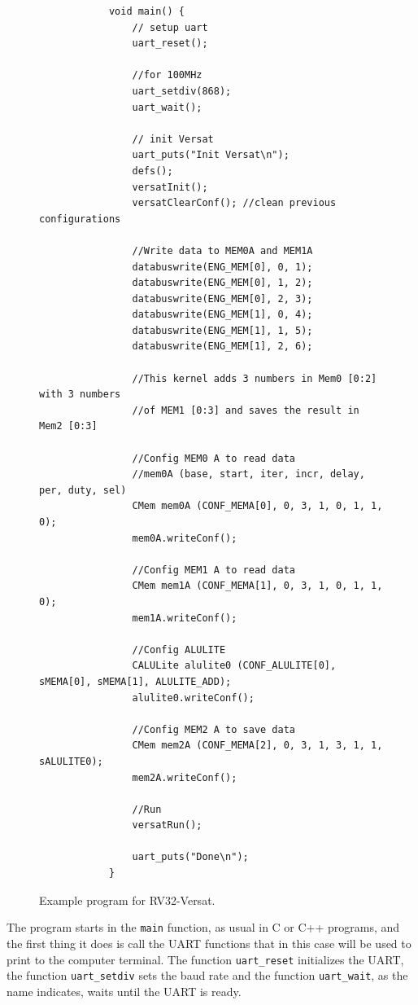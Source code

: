 \begin{figure}[!htb]
	\begin{minipage}{\linewidth}
		\begin{spacing}{0.7}
			\begin{lstlisting}
			void main() {
				// setup uart
				uart_reset();
				
				//for 100MHz
				uart_setdiv(868);
				uart_wait();
				
				// init Versat
				uart_puts("Init Versat\n");
				defs();
				versatInit();
				versatClearConf(); //clean previous configurations
				
				//Write data to MEM0A and MEM1A
				databuswrite(ENG_MEM[0], 0, 1);
				databuswrite(ENG_MEM[0], 1, 2);
				databuswrite(ENG_MEM[0], 2, 3);
				databuswrite(ENG_MEM[1], 0, 4);
				databuswrite(ENG_MEM[1], 1, 5);
				databuswrite(ENG_MEM[1], 2, 6);
				
				//This kernel adds 3 numbers in Mem0 [0:2] with 3 numbers
				//of MEM1 [0:3] and saves the result in Mem2 [0:3]
				
				//Config MEM0 A to read data
				//mem0A (base, start, iter, incr, delay, per, duty, sel)
				CMem mem0A (CONF_MEMA[0], 0, 3, 1, 0, 1, 1, 0);
				mem0A.writeConf();
				
				//Config MEM1 A to read data
				CMem mem1A (CONF_MEMA[1], 0, 3, 1, 0, 1, 1, 0);
				mem1A.writeConf();
				
				//Config ALULITE
				CALULite alulite0 (CONF_ALULITE[0], sMEMA[0], sMEMA[1], ALULITE_ADD);
				alulite0.writeConf();
				
				//Config MEM2 A to save data
				CMem mem2A (CONF_MEMA[2], 0, 3, 1, 3, 1, 1, sALULITE0);
				mem2A.writeConf();
				
				//Run
				versatRun();
				
				uart_puts("Done\n");
			}
			\end{lstlisting}
		\end{spacing}
	\end{minipage}
	\vspace*{-10mm}
	\caption{Example program for RV32-Versat.}
	\label{fig:example}
\end{figure}

The program starts in the {\tt main} function, as usual in C or C++
programs, and the first thing it does is call the UART functions that in this
case will be used to print to the computer terminal. The function
{\tt uart\_reset} initializes the UART, the function
{\tt uart\_setdiv} sets the baud rate and the function
{\tt uart\_wait}, as the name indicates, waits until the \ac{UART} is ready.

